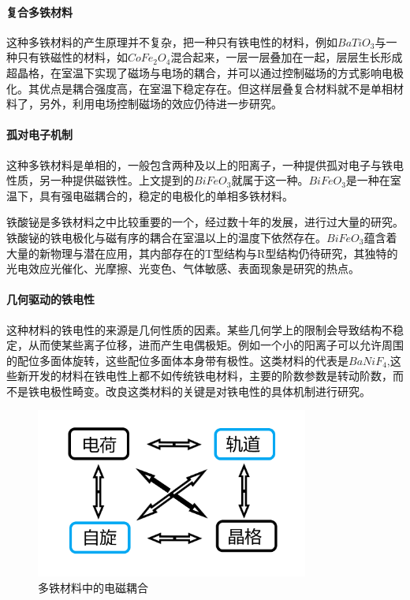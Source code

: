 \paragraph{复合多铁材料}
这种多铁材料的产生原理并不复杂，把一种只有铁电性的材料，例如$BaTiO_{3}$与一种只有铁磁性的材料，如$CoFe_{2}O_{4}$混合起来，一层一层叠加在一起，层层生长形成超晶格，在室温下实现了磁场与电场的耦合，并可以通过控制磁场的方式影响电极化。其优点是耦合强度高，在室温下稳定存在。但这样层叠复合材料就不是单相材料了，另外，利用电场控制磁场的效应仍待进一步研究。\cite{vaz2010magnetoelectric}

\paragraph{孤对电子机制}
这种多铁材料是单相的，一般包含两种及以上的阳离子，一种提供孤对电子与铁电性质，另一种提供磁铁性。上文提到的$BiFeO_{3}$就属于这一种。$BiFeO_{3}$是一种在室温下，具有强电磁耦合的，稳定的电极化的单相多铁材料。

铁酸铋是多铁材料之中比较重要的一个，经过数十年的发展，进行过大量的研究。铁酸铋的铁电极化与磁有序的耦合在室温以上的温度下依然存在。$BiFeO_{3}$蕴含着大量的新物理与潜在应用，其内部存在的T型结构与R型结构仍待研究，其独特的光电效应光催化、光摩擦、光变色、气体敏感、表面现象是研究的热点。\cite{姚携菲2014磁电多铁性材料的宠儿} 

\paragraph{几何驱动的铁电性}
这种材料的铁电性的来源是几何性质的因素。某些几何学上的限制会导致结构不稳定，从而使某些离子位移，进而产生电偶极矩。例如一个小的阳离子可以允许周围的配位多面体旋转，这些配位多面体本身带有极性。这类材料的代表是$BaNiF_{4}$,这些新开发的材料在铁电性上都不如传统铁电材料，主要的阶数参数是转动阶数，而不是铁电极性畸变。改良这类材料的关键是对铁电性的具体机制进行研究。\cite{fox1977ferroelectrically} 

\begin{figure}[h]
    \centering
\includegraphics[width=0.8\textwidth]{./pic/008.png}
\caption{多铁材料中的电磁耦合}

\label{dog008}
\end{figure}

